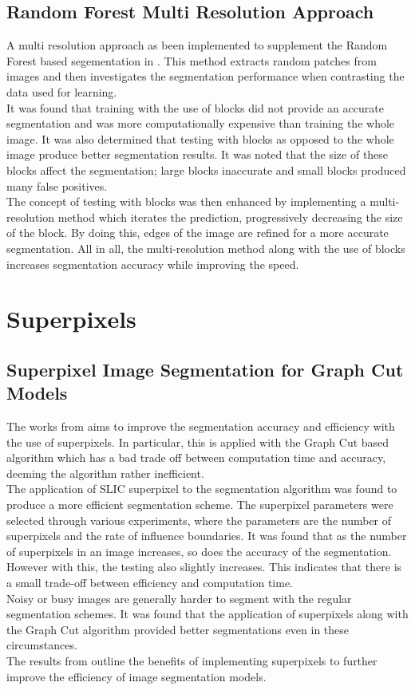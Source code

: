 \subsection{Random Forest Multi Resolution Approach}
A multi resolution approach as been implemented to supplement the Random Forest based segementation in \cite{ref:zhu}. This method extracts random patches from images and then  investigates the segmentation performance when contrasting  the data used for learning.
\\[1\baselineskip]
It was found that training with the use of blocks did not provide an accurate segmentation and was more computationally expensive than training the whole image. It was also determined that testing with blocks as opposed to the whole image produce better segmentation results. It was noted that the size of these blocks affect the segmentation; large blocks inaccurate and small blocks produced many false positives.
\\[1\baselineskip]
The concept of testing with blocks was then enhanced by implementing a multi-resolution method which iterates the prediction, progressively decreasing the size of the block. By doing this, edges of the image are refined for a more accurate segmentation. All in all, the multi-resolution method along with the use of blocks increases segmentation accuracy while improving the speed.
\section{Superpixels}
\subsection{Superpixel Image Segmentation for Graph Cut Models}
The works from \cite{ref:intsp} aims to improve the segmentation accuracy and efficiency with the use of superpixels. In particular, this is applied with the Graph Cut based algorithm which has a bad trade off between computation time and accuracy, deeming the algorithm rather inefficient. 
\\[1\baselineskip]
The application of SLIC superpixel to the segmentation algorithm was found to produce a more efficient segmentation scheme. The superpixel parameters were selected through various experiments, where the parameters are the number of superpixels and the rate of influence boundaries. It was found that as the number of superpixels in an image increases, so does the accuracy of the segmentation. However with this, the testing also slightly increases. This indicates that there is a small trade-off between efficiency and computation time.
\\[1\baselineskip]
Noisy or busy images are generally harder to segment with the regular segmentation schemes. It was found that the application of superpixels along with the Graph Cut algorithm provided better segmentations even in these circumstances. 
\\[1\baselineskip]
The results from \cite{ref:intsp} outline the benefits of implementing superpixels to further improve the efficiency of image segmentation models.
